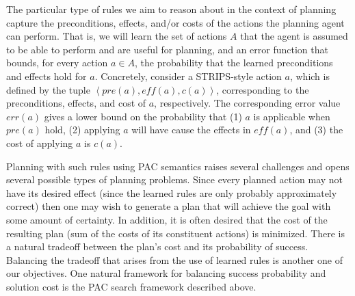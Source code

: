 \documentclass[12pt]{article}
\newcommand{\note}[1]{\textbf{\textit{#1}}}
\newcommand{\tuple}[1]{\ensuremath{\left \langle #1 \right \rangle }}
\newcommand{\eff}{\textit{eff}}
\newcommand{\pre}{\textit{pre}}
\begin{document}
The particular type of rules we aim to reason about in the context of planning capture the preconditions, effects, and/or costs of the actions the planning agent can perform. 
That is, we will learn the set of actions $A$ that the agent is assumed to be able to perform and are useful for planning, 
and an error function that bounds, for every action $a\in A$, 
the probability that the learned preconditions and effects hold for $a$.
Concretely, consider a STRIPS-style action $a$, which is defined by the tuple $\tuple{\pre(a), \eff(a), c(a)}$, corresponding to the preconditions, effects, and cost of $a$, respectively. The corresponding error value $err(a)$ gives a lower bound on the probability that (1) $a$ is applicable when $\pre(a)$ hold, (2) applying $a$ will have cause the effects in $\eff(a)$, and (3) the cost of applying $a$ is $c(a)$. 



Planning with such rules using PAC semantics raises several challenges and opens several possible types of planning problems.
Since every planned action may not have its desired effect (since the learned rules are only probably approximately correct)
then one may wish to generate a plan that will achieve the goal with some amount of certainty. In addition, it is often desired that the cost of the resulting plan (sum of the costs of its constituent actions) is minimized. There is a natural tradeoff between the plan's cost  and its probability of success. 
Balancing the tradeoff that arises from the use of learned rules is another one of our objectives. One natural framework for balancing success probability and solution cost is the PAC search framework described above. 
 

\end{document}
